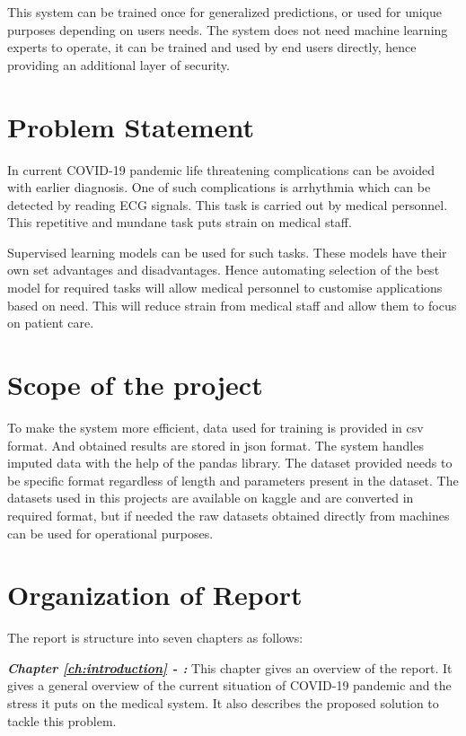 This system can be trained once for generalized predictions, or used for unique purposes depending on users needs. The system does not need machine learning experts to operate, it can be trained and used by end users directly, hence providing an additional layer of security.

\section{Problem Statement} \label{sec:problem_statement}
In current COVID-19 pandemic life threatening complications can be avoided with earlier diagnosis. One of such complications is arrhythmia which can be detected by reading ECG signals. This task is carried out by medical personnel. This repetitive and mundane task puts strain on medical staff.

Supervised learning models can be used for such tasks. These models have their own set advantages and disadvantages. Hence automating selection of the best model for required tasks will allow medical personnel to customise applications based on need. This will reduce strain from medical staff and allow them to focus on patient care.

\section{Scope of the project} \label{sec:scope_of_the_project}

To make the system more efficient, data used for training is provided in csv format. And obtained results are stored in json format. The system handles imputed data with the help of the pandas library. The dataset provided needs to be specific format regardless of length and parameters present in the dataset. The datasets used in this projects are available on kaggle and are converted in required format, but if needed the raw datasets obtained directly from machines can be used for operational purposes.

\section{Organization of Report} \label{sec:organization_of_report}

The report is structure into seven chapters as follows:

\textbf{\textit{Chapter \ref{ch:introduction} - :}}
This chapter gives an overview of the report. It gives a general overview of the current situation of COVID-19 pandemic and the stress it puts on the medical system. It also describes the proposed solution to tackle this problem.


